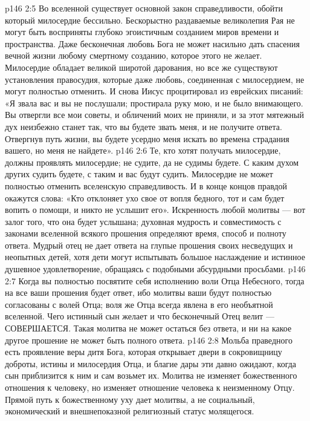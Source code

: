 \vs p146 2:5 \pc {}\bibnobreakspace Во вселенной существует основной закон справедливости, обойти который милосердие бессильно. Бескорыстно раздаваемые великолепия Рая не могут быть восприняты глубоко эгоистичным созданием миров времени и пространства. Даже бесконечная любовь Бога не может насильно дать спасения вечной жизни любому смертному созданию, которое этого не желает. Милосердие обладает великой широтой дарования, но все же существуют установления правосудия, которые даже любовь, соединенная с милосердием, не могут полностью отменить. И снова Иисус процитировал из еврейских писаний: «Я звала вас и вы не послушали; простирала руку мою, и не было внимающего. Вы отвергли все мои советы, и обличений моих не приняли, и за этот мятежный дух неизбежно станет так, что вы будете звать меня, и не получите ответа. Отвергнув путь жизни, вы будете усердно меня искать во времена страдания вашего, но меня не найдете».
\vs p146 2:6 \pc {}\bibnobreakspace Те, кто хотят получать милосердие, должны проявлять милосердие; не судите, да не судимы будете. С каким духом других судить будете, с таким и вас будут судить. Милосердие не может полностью отменить вселенскую справедливость. И в конце концов правдой окажутся слова: «Кто отклоняет ухо свое от вопля бедного, тот и сам будет вопить о помощи, и никто не услышит его». Искренность любой молитвы --- вот залог того, что она будет услышана; духовная мудрость и совместимость с законами вселенной всякого прошения определяют время, способ и полноту ответа. Мудрый отец не дает  ответа на глупые прошения своих несведущих и неопытных детей, хотя дети могут испытывать большое наслаждение и истинное душевное удовлетворение, обращаясь с подобными абсурдными просьбами.
\vs p146 2:7 \pc {}\bibnobreakspace Когда вы полностью посвятите себя исполнению воли Отца Небесного, тогда на все ваши прошения будет ответ, ибо молитвы ваши будут полностью согласованы с волей Отца; воля же Отца всегда явлена в его необъятной вселенной. Чего истинный сын желает и что бесконечный Отец велит --- СОВЕРШАЕТСЯ. Такая молитва не может остаться без ответа, и ни на какое другое прошение не может быть полного ответа.
\vs p146 2:8 \pc {}\bibnobreakspace Мольба праведного есть проявление веры дитя Бога, которая открывает двери в сокровищницу доброты, истины и милосердия Отца, и благие дары эти давно ожидают, когда сын приблизится к ним и сам возьмет их. Молитва не изменяет божественного отношения к человеку, но изменяет отношение человека к неизменному Отцу. Прямой путь к божественному уху дает  молитвы, а не социальный, экономический и внешнепоказной религиозный статус молящегося.
